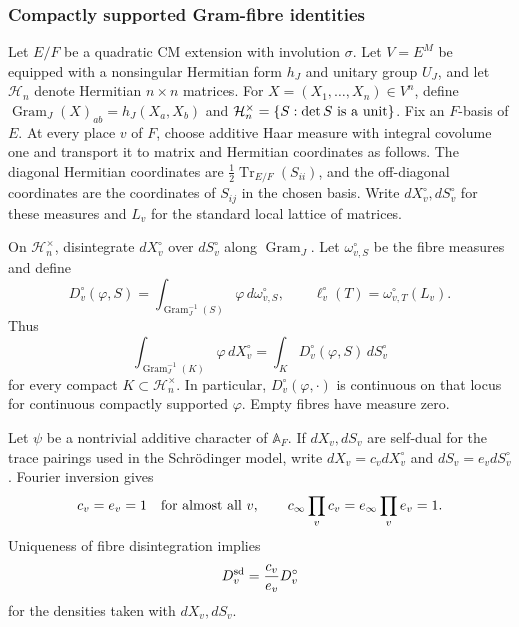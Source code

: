 \subsubsection{Compactly supported Gram-fibre identities}

Let $E/F$ be a quadratic CM extension with involution $\sigma$. Let $V=E^M$ be equipped with a nonsingular Hermitian form $h_J$ and unitary group $U_J$, and let $\mathcal H_n$ denote Hermitian $n\times n$ matrices. For $X=(X_1,\ldots,X_n)\in V^n$, define $\operatorname{Gram}_J(X)_{ab}=h_J(X_a,X_b)$ and $\mathcal H_n^\times=\{S:\det S\ {\rm is\ a\ unit}\}$. Fix an $F$-basis of $E$. At every place $v$ of $F$, choose additive Haar measure with integral covolume one and transport it to matrix and Hermitian coordinates as follows. The diagonal Hermitian coordinates are $\tfrac12\operatorname{Tr}_{E/F}(S_{ii})$, and the off-diagonal coordinates are the coordinates of $S_{ij}$ in the chosen basis. Write $dX_v^\circ,dS_v^\circ$ for these measures and $L_v$ for the standard local lattice of matrices.

On $\mathcal H_n^\times$, disintegrate $dX_v^\circ$ over $dS_v^\circ$ along $\operatorname{Gram}_J$. Let $\omega_{v,S}^\circ$ be the fibre measures and define
\[
 D_v^\circ(\varphi,S)=\int_{\operatorname{Gram}_J^{-1}(S)}\varphi\,d\omega_{v,S}^\circ,
 \qquad \ell_v^\circ(T)=\omega_{v,T}^\circ(L_v).
\]
Thus
\[
 \int_{\operatorname{Gram}_J^{-1}(K)}\varphi\,dX_v^\circ
 =\int_KD_v^\circ(\varphi,S)\,dS_v^\circ
\]
for every compact $K\subset\mathcal H_n^\times$. In particular, $D_v^\circ(\varphi,\cdot)$ is continuous on that locus for continuous compactly supported $\varphi$. Empty fibres have measure zero.

Let $\psi$ be a nontrivial additive character of $\mathbb A_F$. If $dX_v,dS_v$ are self-dual for the trace pairings used in the Schrödinger model, write $dX_v=c_vdX_v^\circ$ and $dS_v=e_vdS_v^\circ$. Fourier inversion gives
\[
 c_v=e_v=1\quad\hbox{for almost all }v,\qquad
 c_\infty\prod_vc_v=e_\infty\prod_ve_v=1.
\]
Uniqueness of fibre disintegration implies
\[
 D_v^{\rm sd}={c_v\over e_v}D_v^\circ
\]
for the densities taken with $dX_v,dS_v$.

